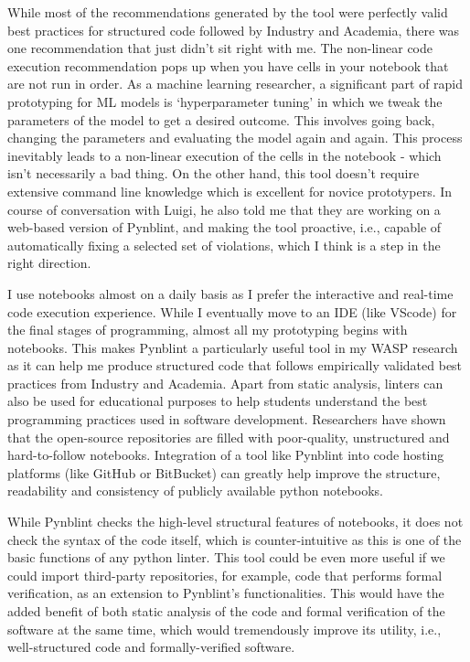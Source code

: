 \documentclass[11pt]{article}
\begin{document}
\par{While most of the recommendations generated by the tool were perfectly valid best practices for structured code followed by Industry and Academia, there was one recommendation that just didn’t sit right with me. The non-linear code execution recommendation pops up when you have cells in your notebook that are not run in order. As a machine learning researcher, a significant part of rapid prototyping for ML models is ‘hyperparameter tuning’ in which we tweak the parameters of the model to get a desired outcome. This involves going back, changing the parameters and evaluating the model again and again. This process inevitably leads to a non-linear execution of the cells in the notebook - which isn’t necessarily a bad thing. On the other hand, this tool doesn’t require extensive command line knowledge which is excellent for novice prototypers. In course of conversation with Luigi, he also told me that they are working on a web-based version of Pynblint, and making the tool proactive, i.e., capable of automatically fixing a selected set of violations, which I think is a step in the right direction.} 
\\
\par{I use notebooks almost on a daily basis as I prefer the interactive and real-time code execution experience. While I eventually move to an IDE (like VScode) for the final stages of programming, almost all my prototyping begins with notebooks. This makes Pynblint a particularly useful tool in my WASP research as it can help me produce structured code that follows empirically validated best practices from Industry and Academia. Apart from static analysis, linters can also be used for educational purposes to help students understand the best programming practices used in software development. Researchers have shown that the open-source repositories are filled with poor-quality, unstructured and hard-to-follow notebooks. Integration of a tool like Pynblint into code hosting platforms (like GitHub or BitBucket) can greatly help improve the structure, readability and consistency of publicly available python notebooks.}
\\
\par{While Pynblint checks the high-level structural features of notebooks, it does not check the syntax of the code itself, which is counter-intuitive as this is one of the basic functions of any python linter. This tool could be even more useful if we could import third-party repositories, for example, code that performs formal verification, as an extension to Pynblint's functionalities. This would have the added benefit of both static analysis of the code and formal verification of the software at the same time, which would tremendously improve its utility, i.e., well-structured code and formally-verified software.}
\\
\end{document}
